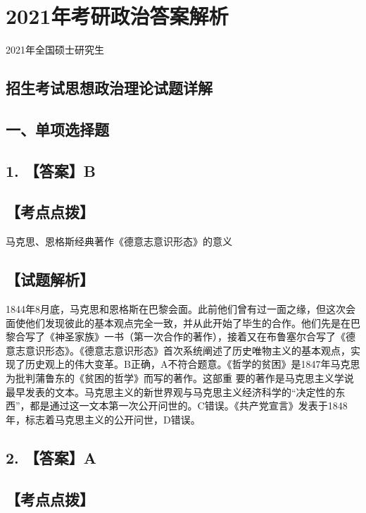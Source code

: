 \documentclass[UTF8,11pt]{ctexart}
\begin{document}
\section*{2021年考研政治答案解析}
2021年全国硕士研究生


\subsection*{招生考试思想政治理论试题详解}

\subsection*{一、单项选择题}

\subsection*{1. 【答案】B}

\subsection*{【考点点拨】}

马克思、恩格斯经典著作《德意志意识形态》的意义


\subsection*{【试题解析】}

1844年8月底，马克思和恩格斯在巴黎会面。此前他们曾有过一面之缘，但这次会面使他们发现彼此的基本观点完全一致，并从此开始了毕生的合作。他们先是在巴黎合写了《神圣家族》一书（第一次合作的著作），接着又在布鲁塞尔合写了《德意志意识形态》。《德意志意识形态》首次系统阐述了历史唯物主义的基本观点，实现了历史观上的伟大变革。B正确，A不符合题意。《哲学的贫困》是1847年马克思为批判蒲鲁东的《贫困的哲学》而写的著作。这部重 要的著作是马克思主义学说最早发表的文本。马克思主义的新世界观与马克思主义经济科学的“决定性的东西”，都是通过这一文本第一次公开问世的。C错误。《共产党宣言》发表于1848年，标志着马克思主义的公开问世，D错误。


\subsection*{2. 【答案】A}

\subsection*{【考点点拨】}
\end{document}
